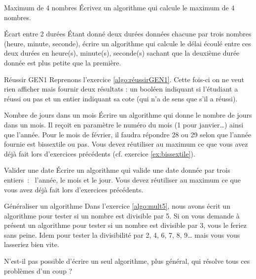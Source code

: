 	\begin{Exercice}{Maximum de 4 nombres}
		Écrivez un algorithme qui calcule le maximum de 4 nombres.
	\end{Exercice}

	\begin{Exercice}{Écart entre 2 durées}
		Étant donné deux durées données chacune par trois
		nombres (heure, minute, seconde),
		écrire un algorithme qui calcule
		le délai écoulé entre ces deux durées en heure(s), minute(s),
		seconde(s) sachant que la deuxième durée donnée 
		est plus petite que la première.
	\end{Exercice}
	
	\begin{Exercice}{Réussir GEN1}
		Reprenons l'exercice \vref{algo:réussirGEN1}.
		Cette fois-ci on ne veut rien afficher
		mais fournir deux résultats :
		un booléen indiquant si l'étudiant a réussi ou pas
		et un entier indiquant sa cote (qui n'a de sens que s'il a réussi). 
	\end{Exercice}

	\begin{Exercice}{Nombre de jours dans un mois}
		Écrire un algorithme qui donne le nombre de jours dans un mois.
		Il reçoit en paramètre le numéro du mois (1 pour janvier\dots)
		ainsi que l'année.
		Pour le mois de février, 
		il faudra répondre 28 ou 29 selon que l'année fournie
		est bissextile ou pas.
		Vous devez réutiliser au maximum ce que vous avez déjà fait
		lors d'exercices précédents (cf. exercice \vref{ex:bissextile}).
	\end{Exercice}

	\begin{Exercice}{Valider une date}
		Écrire un algorithme qui valide 
		une date donnée par trois entiers~:~ l’année, le mois et le jour.
		Vous devez réutiliser au maximum ce que vous avez déjà fait
		lors d'exercices précédents.
	\end{Exercice}
	
	\begin{Exercice}{Généraliser un algorithme}
		Dans l'exercice \vref{algo:mult5},
		nous avons écrit un algorithme 
		pour tester si un nombre est divisible par 5.
		Si on vous demande à présent
		un algorithme pour tester si un nombre est divisible par 3,
		vous le feriez sans peine.
		Idem pour tester la divisibilité par 2, 4, 6, 7, 8, 9\dots{}
		mais vous vous lasseriez bien vite.
		
		N'est-il pas possible d'écrire un seul algorithme,
		plus général, qui résolve tous ces problèmes d'un coup ?  
	\end{Exercice}
	
